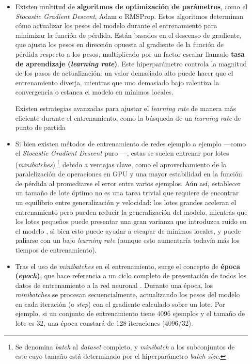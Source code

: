 \begin{itemize}
    \item Existen multitud de \textbf{algoritmos de optimización de parámetros}, como el \textit{Stocastic 
    Gradient Descent}, Adam o RMSProp. 
    Estos algoritmos determinan cómo actualizar los pesos del modelo durante el entrenamiento para minimizar 
    la función de pérdida. 
    Están basados en el descenso de gradiente, que ajusta los pesos en dirección opuesta al gradiente de 
    la función de pérdida respecto a los pesos, multiplicado por un factor escalar llamado \textbf{tasa 
    de aprendizaje (\textit{learning rate})}. Este hiperparámetro controla la magnitud de los pasos de 
    actualización: un valor demasiado alto puede hacer que el entrenamiento diverja, mientras que uno 
    demasiado bajo ralentiza la convergencia o estanca el modelo en mínimos locales.

    Existen estrategias avanzadas para ajustar el \textit{learning rate} de manera más eficiente durante el 
    entrenamiento, como la búsqueda de un \textit{learning rate} de punto de partida 


    \item Si bien existen métodos de entrenamiento de redes ejemplo a ejemplo ---como el \textit{Stocastic 
    Gradient Descent} puro \cite{bottou2010}---, estas se suelen entrenar por lotes 
    (\textit{minibatches})%
    \footnote{
        Se denomina \textit{batch} al \textit{dataset} completo, y \textit{minibatch} a los subconjuntos de
        este cuyo tamaño está determinado por el hiperparámetro \textit{batch size}.
    } 
    debido a ventajas clave, como el aprovechamiento de la paralelización de operaciones en GPU y una mayor 
    estabilidad en la función de pérdida al promediarse el error entre varios ejemplos. 
    Aún así, establecer un tamaño de lote óptimo no es una tarea trivial que requiere de encontrar un 
    equilibrio entre generalización y velocidad: los lotes grandes aceleran el entrenamiento pero pueden 
    reducir la generalización del modelo, mientras que los lotes pequeños puede presentar una gran varianza 
    que introduzca ruido en el modelo \cite{keskar2017}, si bien esto puede ayudar a escapar de mínimos 
    locales, y puede paliarse con un bajo \textit{learning rate} (aunque esto aumentaría todavía más los 
    tiempos de entrenamiento).
    

    \item Tras el uso de \textit{minibatches} en el entrenamiento, surge el concepto de \textbf{época 
    (\textit{epoch})}, que hace referencia a un ciclo completo de presentación de todos los datos de 
    entrenamiento a la red neuronal \cite{rusell2021}. Durante una época, los \textit{minibatches} se procesan 
    secuencialmente, actualizando los pesos del modelo en cada iteración (o \textit{step}) con el gradiente 
    calculado sobre un lote. Por ejemplo, si un conjunto de entrenamiento tiene 4096 ejemplos y el tamaño de 
    lote es 32, una época constará de 128 iteraciones (4096/32).


\end{itemize}

